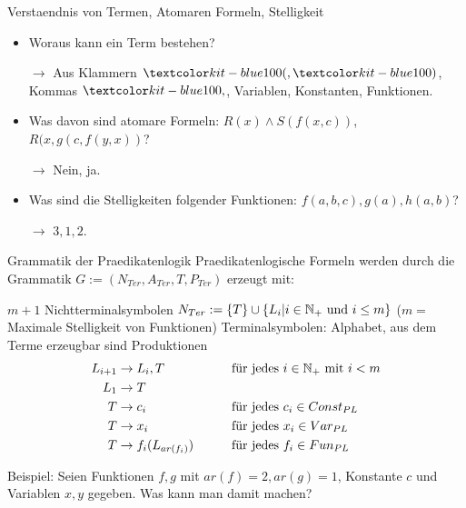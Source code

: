 \documentclass[]{beamer}
\begin{document}
\begin{frame}{Verstaendnis von Termen, Atomaren Formeln, Stelligkeit}
\begin{itemize}
	\item Woraus kann ein Term bestehen? \pause
	\item[$\rightarrow$] Aus Klammern $\markBlue{(}, \markBlue{)}$, Kommas $\markBlue{,}$, Variablen, Konstanten, Funktionen.\pause
	\item Was davon sind atomare Formeln: $R(x) \land S(f(x, c))$, $R(x, g(c, f(y, x))$?\pause
	\item[$\rightarrow$] Nein, ja.\pause
	\item Was sind die Stelligkeiten folgender Funktionen: $f(a, b, c), g(a), h(a, b)$? \pause \item[$\rightarrow$] $3,1,2$.
\end{itemize}	
\end{frame}

\begin{frame}{Grammatik der Praedikatenlogik}
	Praedikatenlogische Formeln werden durch die Grammatik $G := (N_{Ter}, A_{Ter}, T, P_{Ter})$ erzeugt mit:
	
	\bp
	
	\begin{itemize}
		\pitem $m+1$ Nichtterminalsymbolen $N_{Ter} := \{T\} \cup \{L_i | i \in \mathbb{N}_+ \text{ und } i \leq m \}$ ($m = $ Maximale Stelligkeit von Funktionen)
		\pitem Terminalsymbolen: Alphabet, aus dem Terme erzeugbar sind
		\pitem Produktionen
		\begin{alignat*}{2}
		L_{i+1} &\to L_i , T &\qquad& \text{für jedes } i\in\N_+\text{ mit } i<m   \\
		L_1  &\to T \\ %
		T &\to c_i && \text{für jedes } c_i\in Const_{PL}\\
		T &\to x_i && \text{für jedes } x_i\in Var_{PL}\\
		T &\to f_i(L_{ar(f_i)} ) && \text{für jedes } f_i\in Fun_{PL}
		\end{alignat*}
	\end{itemize}

	\bp
	
	Beispiel: Seien Funktionen $f,g$ mit $ar(f) = 2, ar(g) = 1$, Konstante $c$ und Variablen $x,y$ gegeben. Was kann man damit machen?
\end{frame}
\end{document}
